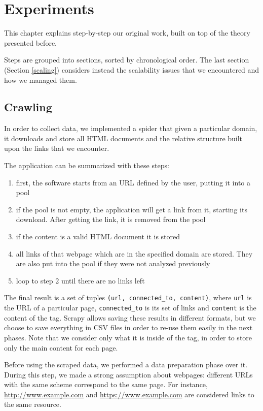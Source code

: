 \chapter{Experiments}
This chapter explains step-by-step our original work, built on top of the theory presented before.

Steps are grouped into sections, sorted by chronological order.
The last section (Section \ref{scaling}) considers instead the scalability issues that we encountered and how we managed them.



\section{Crawling} \label{crawling}
In order to collect data, 
we implemented a spider that given a particular domain, it downloads and store all HTML documents 
and the relative structure built upon the links that we encounter.

The application can be summarized with these steps:
\begin{enumerate}
    \item first, the software starts from an URL defined by the user, putting it into a pool
    \item if the pool is not empty, the application will get a link from it, starting its download. After getting the link, it is removed from the pool
    \item if the content is a valid HTML document it is stored
    \item all links of that webpage which are in the specified domain are stored. They are also put into the pool if they were not analyzed previously
    \item loop to step 2 until there are no links left
\end{enumerate}

The final result is a set of tuples \texttt{(url, connected\_to, content)}, where \texttt{url} is the URL of a particular page, \texttt{connected\_to} is its set of links and \texttt{content} is the content of the  tag.
Scrapy allows saving these results in different formats, but we choose to save everything in CSV files in order to re-use them easily in the next phases.
Note that we consider only what it is inside of the  tag, in order to store only the main content for each page.

Before using the scraped data, we performed a data preparation phase over it.
During this step, we made a strong assumption about webpages:
different URLs with the same scheme correspond to the same page.
For instance, \url{http://www.example.com} and \url{https://www.example.com}
are considered links to the same resource. 

